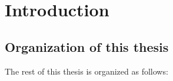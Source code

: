 \chapter{Introduction} \label{chap:intro}

\section{Organization of this thesis}
The rest of this thesis is organized as follows:
